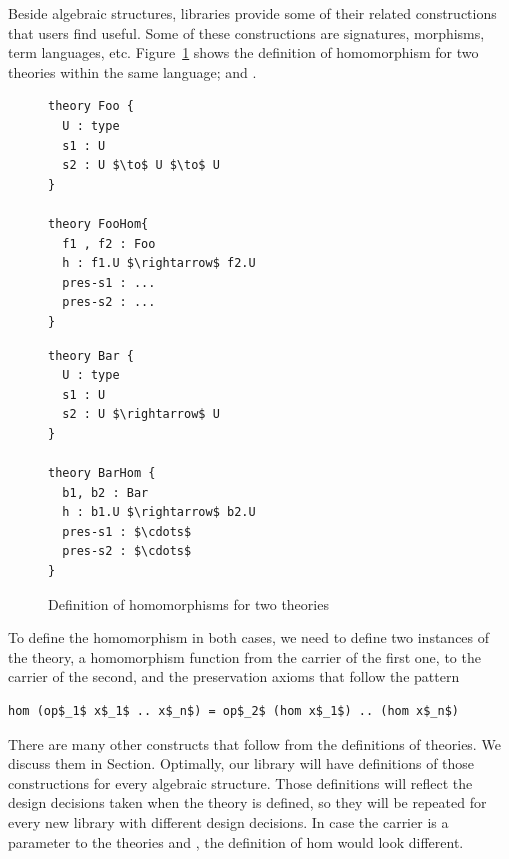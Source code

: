 Beside algebraic structures, libraries provide some of their related constructions that users find useful. Some of these constructions are signatures, morphisms, term languages, etc. 
Figure~\ref{fig:hom-foo-bar} shows the definition of homomorphism for two theories within the same language;  and . 
\begin{figure}
\begin{multicols}{2}
  \begin{lstlisting}[mathescape]
theory Foo { 
  U : type 
  s1 : U 
  s2 : U $\to$ U $\to$ U
}

theory FooHom{
  f1 , f2 : Foo 
  h : f1.U $\rightarrow$ f2.U 
  pres-s1 : ... 
  pres-s2 : ... 
}
\end{lstlisting}        
\columnbreak
\begin{lstlisting}[mathescape]
theory Bar {
  U : type 
  s1 : U 
  s2 : U $\rightarrow$ U 
}

theory BarHom { 
  b1, b2 : Bar 
  h : b1.U $\rightarrow$ b2.U 
  pres-s1 : $\cdots$
  pres-s2 : $\cdots$
}
\end{lstlisting}
\end{multicols}    
\caption{Definition of homomorphisms for two theories}
\label{fig:hom-foo-bar}
\end{figure}

To define the homomorphism in both cases, we need to define two instances of the theory, a homomorphism function from the carrier of the first one, to the carrier of the second, and the preservation axioms that follow the pattern
\begin{lstlisting}[mathescape]
hom (op$_1$ x$_1$ .. x$_n$) = op$_2$ (hom x$_1$) .. (hom x$_n$)
\end{lstlisting} 

There are many other constructs that follow from the definitions of theories. We discuss them in Section. 
Optimally, our library will have definitions of those constructions for every algebraic structure. Those definitions will reflect the design decisions taken when the theory is defined, so they will be repeated for every new library with different design decisions. In case the carrier is a parameter to the theories  and , the definition of hom would look different. 

